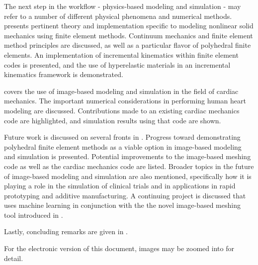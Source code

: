 The next step in the workflow - physics-based modeling and simulation - may refer to a number of different physical phenomena and numerical methods.  presents pertinent theory and implementation specific to modeling nonlinear solid mechanics using finite element methods. Continuum mechanics and finite element method principles are discussed, as well as a particular flavor of polyhedral finite elements. An implementation of incremental kinematics within finite element codes is presented, and the use of hyperelastic materials in an incremental kinematics framework is demonstrated.

 covers the use of image-based modeling and simulation in the field of cardiac mechanics. The important numerical considerations in performing human heart modeling are discussed. Contributions made to an existing cardiac mechanics code are highlighted, and simulation results using that code are shown.

Future work is discussed on several fronts in . Progress toward demonstrating polyhedral finite element methods as a viable option in image-based modeling and simulation is presented. Potential improvements to the image-based meshing code as well as the cardiac mechanics code are listed. Broader topics in the future of image-based modeling and simulation are also mentioned, specifically how it is playing a role in the simulation of clinical trials and in applications in rapid prototyping and additive manufacturing. A continuing project is discussed that uses machine learning in conjunction with the the novel image-based meshing tool introduced in .

Lastly, concluding remarks are given in .

For the electronic version of this document, images may be zoomed into for detail.
